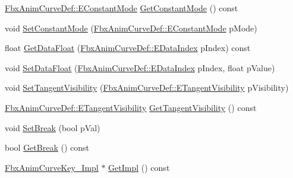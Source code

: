 \begin{DoxyCompactItemize}
\item 
\hyperlink{class_fbx_anim_curve_def_a52885abd392ac8ac3da94bafc5fddd64}{Fbx\+Anim\+Curve\+Def\+::\+E\+Constant\+Mode} \hyperlink{class_fbx_anim_curve_key_ade9ff492dbe914f25b6a0404d0121a83}{Get\+Constant\+Mode} () const
\item 
void \hyperlink{class_fbx_anim_curve_key_a6a34c333a4b4f90cf04492c9c31bedcb}{Set\+Constant\+Mode} (\hyperlink{class_fbx_anim_curve_def_a52885abd392ac8ac3da94bafc5fddd64}{Fbx\+Anim\+Curve\+Def\+::\+E\+Constant\+Mode} p\+Mode)
\item 
float \hyperlink{class_fbx_anim_curve_key_a3185c35241a072105f14327afd275452}{Get\+Data\+Float} (\hyperlink{class_fbx_anim_curve_def_a3be261d961f8226235529b148cf80300}{Fbx\+Anim\+Curve\+Def\+::\+E\+Data\+Index} p\+Index) const
\item 
void \hyperlink{class_fbx_anim_curve_key_ad61a4843c52e4ba3a21102c577950dc5}{Set\+Data\+Float} (\hyperlink{class_fbx_anim_curve_def_a3be261d961f8226235529b148cf80300}{Fbx\+Anim\+Curve\+Def\+::\+E\+Data\+Index} p\+Index, float p\+Value)
\item 
void \hyperlink{class_fbx_anim_curve_key_af38b131031d26da6038b89c17498f05f}{Set\+Tangent\+Visibility} (\hyperlink{class_fbx_anim_curve_def_a70c49072776ac6b3426c57dd80e16e3b}{Fbx\+Anim\+Curve\+Def\+::\+E\+Tangent\+Visibility} p\+Visibility)
\item 
\hyperlink{class_fbx_anim_curve_def_a70c49072776ac6b3426c57dd80e16e3b}{Fbx\+Anim\+Curve\+Def\+::\+E\+Tangent\+Visibility} \hyperlink{class_fbx_anim_curve_key_ada99141bd5cd9218fe7eaa4ce00ae5db}{Get\+Tangent\+Visibility} () const
\item 
void \hyperlink{class_fbx_anim_curve_key_a688bc80bc9b18052f8bc078293fba426}{Set\+Break} (bool p\+Val)
\item 
bool \hyperlink{class_fbx_anim_curve_key_a3cf927120c152c7a5d8ac258ad7ebc88}{Get\+Break} () const
\item 
\hyperlink{class_fbx_anim_curve_key___impl}{Fbx\+Anim\+Curve\+Key\+\_\+\+Impl} $\ast$ \hyperlink{class_fbx_anim_curve_key_a21427b9606e3bb19b87f1bda1197a5eb}{Get\+Impl} () const
\end{DoxyCompactItemize}
